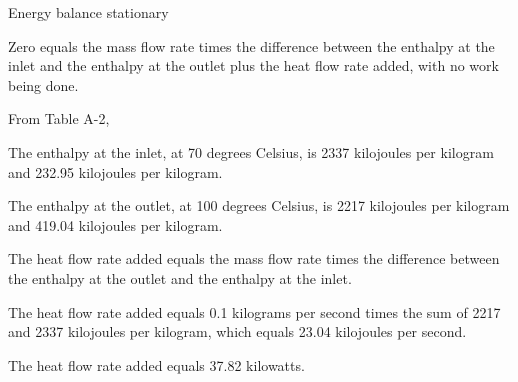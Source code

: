 Energy balance stationary

Zero equals the mass flow rate times the difference between the enthalpy at the inlet and the enthalpy at the outlet plus the heat flow rate added, with no work being done.

From Table A-2,

The enthalpy at the inlet, at 70 degrees Celsius, is 2337 kilojoules per kilogram and 232.95 kilojoules per kilogram.

The enthalpy at the outlet, at 100 degrees Celsius, is 2217 kilojoules per kilogram and 419.04 kilojoules per kilogram.

The heat flow rate added equals the mass flow rate times the difference between the enthalpy at the outlet and the enthalpy at the inlet.

The heat flow rate added equals 0.1 kilograms per second times the sum of 2217 and 2337 kilojoules per kilogram, which equals 23.04 kilojoules per second.

The heat flow rate added equals 37.82 kilowatts.